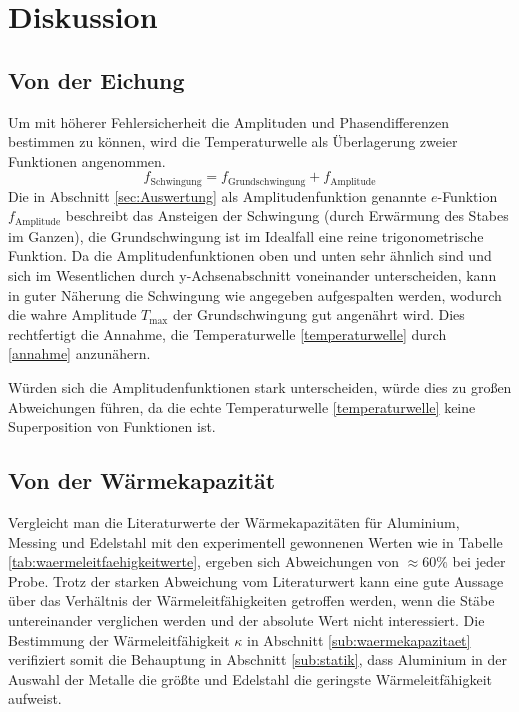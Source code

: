 \section{Diskussion}
\label{sec:Diskussion}
\subsection{Von der Eichung}
Um mit höherer Fehlersicherheit die Amplituden und Phasendifferenzen bestimmen zu können, wird die Temperaturwelle als Überlagerung zweier Funktionen angenommen. 
\begin{equation}
	\label{annahme}
	f_\text{Schwingung}= f_\text{Grundschwingung}+f_\text{Amplitude}
\end{equation}
Die in Abschnitt \ref{sec:Auswertung} als Amplitudenfunktion genannte $e$-Funktion $f_\text{Amplitude}$ beschreibt das Ansteigen der Schwingung (durch Erwärmung des Stabes im Ganzen), die Grundschwingung ist im Idealfall eine reine trigonometrische Funktion. 
Da die Amplitudenfunktionen oben und unten sehr ähnlich sind und sich im Wesentlichen durch y-Achsenabschnitt voneinander unterscheiden, kann in guter Näherung die Schwingung wie angegeben aufgespalten werden, wodurch die wahre Amplitude $T_\text{max}$ der Grundschwingung gut angenährt wird.
Dies rechtfertigt die Annahme, die Temperaturwelle \ref{temperaturwelle} durch \eqref{annahme} anzunähern.

Würden sich die Amplitudenfunktionen stark unterscheiden, würde dies zu großen Abweichungen führen, da die echte Temperaturwelle \ref{temperaturwelle} keine Superposition von Funktionen ist.

\subsection{Von der Wärmekapazität}
Vergleicht man die Literaturwerte der Wärmekapazitäten für Aluminium, Messing und Edelstahl mit den experimentell gewonnenen Werten wie in Tabelle \ref{tab:waermeleitfaehigkeitwerte}, ergeben sich Abweichungen von $\approx60\%$ bei jeder Probe. 
Trotz der starken Abweichung vom Literaturwert kann eine gute Aussage über das Verhältnis der Wärmeleitfähigkeiten getroffen werden, 
wenn die Stäbe untereinander verglichen werden und der absolute Wert nicht interessiert.
Die Bestimmung der Wärmeleitfähigkeit $\kappa$ in Abschnitt \ref{sub:waermekapazitaet} verifiziert somit die Behauptung in Abschnitt \ref{sub:statik}, dass Aluminium in der Auswahl der Metalle die größte und Edelstahl die geringste Wärmeleitfähigkeit aufweist.

